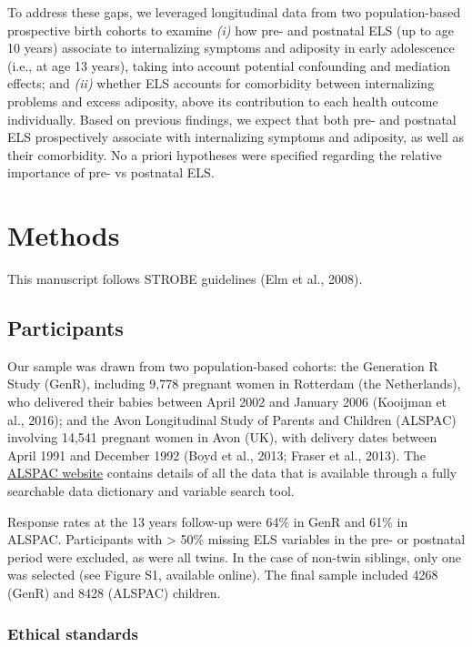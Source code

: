 \documentclass[
  letterpaper,
  DIV=11,
  numbers=noendperiod]{scrreport}
\begin{document}
To address these gaps, we leveraged longitudinal data from two
population-based prospective birth cohorts to examine \emph{(i)} how
pre- and postnatal ELS (up to age 10 years) associate to internalizing
symptoms and adiposity in early adolescence (i.e., at age 13 years),
taking into account potential confounding and mediation effects; and
\emph{(ii)} whether ELS accounts for comorbidity between internalizing
problems and excess adiposity, above its contribution to each health
outcome individually. Based on previous findings, we expect that both
pre- and postnatal ELS prospectively associate with internalizing
symptoms and adiposity, as well as their comorbidity. No a priori
hypotheses were specified regarding the relative importance of pre- vs
postnatal ELS.

\section{Methods}\label{methods}

This manuscript follows STROBE guidelines (Elm et al., 2008).

\subsection{Participants}\label{participants}

Our sample was drawn from two population-based cohorts: the Generation R
Study (GenR), including 9,778 pregnant women in Rotterdam (the
Netherlands), who delivered their babies between April 2002 and January
2006 (Kooijman et al., 2016); and the Avon Longitudinal Study of Parents
and Children (ALSPAC) involving 14,541 pregnant women in Avon (UK), with
delivery dates between April 1991 and December 1992 (Boyd et al., 2013;
Fraser et al., 2013). The
\href{http://www.bristol.ac.uk/alspac/researchers/our-data/}{ALSPAC
website} contains details of all the data that is available through a
fully searchable data dictionary and variable search tool.

Response rates at the 13 years follow-up were 64\% in GenR and 61\% in
ALSPAC. Participants with \textgreater{} 50\% missing ELS variables in
the pre- or postnatal period were excluded, as were all twins. In the
case of non-twin siblings, only one was selected (see Figure S1,
available online). The final sample included 4268 (GenR) and 8428
(ALSPAC) children.

\subsubsection{Ethical standards}\label{ethical-standards}
\end{document}
